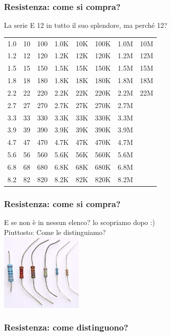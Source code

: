 		\begin{frame}[c]\frametitle{Resistenza: come si compra?}

		\centering La serie E 12 in tutto il suo splendore, ma perché 12?
		    
		\begin{tabular}{c|c|c|c|c|c|c|c}
			1.0 & 10 & 100 & 1.0K & 10K & 100K & 1.0M & 10M \\
			1.2 & 12 & 120 & 1.2K & 12K & 120K & 1.2M & 12M \\ 
			1.5 & 15 & 150 & 1.5K & 15K & 150K & 1.5M & 15M  \\
			1.8 & 18 & 180 & 1.8K & 18K & 180K & 1.8M & 18M  \\
			2.2 & 22 & 220 & 2.2K & 22K & 220K & 2.2M & 22M  \\
			2.7 & 27 & 270 & 2.7K & 27K & 270K & 2.7M & \\
			3.3 & 33 & 330 & 3.3K & 33K & 330K & 3.3M & \\
			3.9 & 39 & 390 & 3.9K & 39K & 390K & 3.9M & \\
			4.7 & 47 & 470 & 4.7K & 47K & 470K & 4.7M & \\
			5.6 & 56 & 560 & 5.6K & 56K & 560K & 5.6M & \\
			6.8 & 68 & 680 & 6.8K & 68K & 680K & 6.8M & \\
			8.2 & 82 & 820 & 8.2K & 82K & 820K & 8.2M & \\
		\end{tabular}
		
		\end{frame}

		\begin{frame}[c]\frametitle{Resistenza: come si compra?}
		    \centering
		E se non è in nessun elenco? lo scopriamo dopo :)\\
		Piuttosto: Come le distinguiamo?\\
		\includegraphics[width=4cm]{./img/resistenze.jpg}
		
		\end{frame}

		\begin{frame}[c]\frametitle{Resistenza: come distinguono?}
		    
		
		\end{frame}
	
